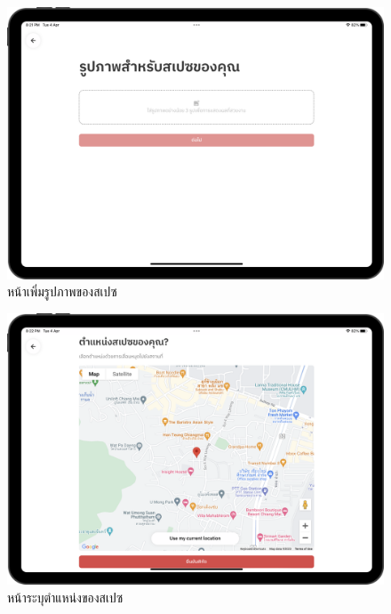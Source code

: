 \begin{figure}[ht]
    \begin{center}
    \includegraphics[width=5.5in]{./image/Flowider_place_img.png}
    \end{center}
    \caption[Flowider place image]{หน้าเพิ่มรูปภาพของสเปซ}
    \label{fig:Flowider_place_img}
\end{figure}
\begin{figure}[ht]
    \begin{center}
    \includegraphics[width=5.5in]{./image/Flowider_place_location.png}
    \end{center}
    \caption[Flowider place location]{หน้าระบุตำแหน่งของสเปซ}
    \label{fig:Flowider_place_location}
\end{figure}
